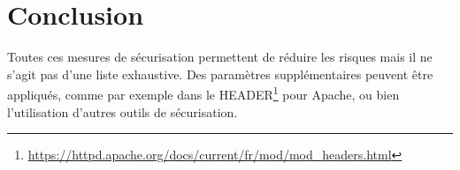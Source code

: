 \section{Conclusion}
Toutes ces mesures de sécurisation permettent de réduire les risques mais il ne s'agit pas d'une liste exhaustive. Des paramètres supplémentaires peuvent être appliqués, comme par exemple dans le HEADER\footnote{\url{https://httpd.apache.org/docs/current/fr/mod/mod_headers.html}} pour Apache, ou bien l'utilisation d'autres outils de sécurisation.